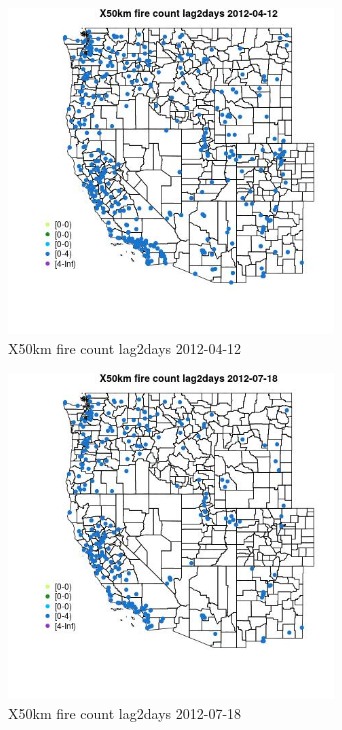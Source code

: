 \begin{figure} 
\centering  
\includegraphics[width=0.77\textwidth]{Code_Outputs/Report_ML_input_PM25_Step4_part_e_de_duplicated_aves_compiled_2019-05-14wNAs_MapObsX50km_fire_count_lag2days2012-04-12.jpg} 
\caption{\label{fig:Report_ML_input_PM25_Step4_part_e_de_duplicated_aves_compiled_2019-05-14wNAsMapObsX50km_fire_count_lag2days2012-04-12}X50km fire count lag2days 2012-04-12} 
\end{figure} 
 

\begin{figure} 
\centering  
\includegraphics[width=0.77\textwidth]{Code_Outputs/Report_ML_input_PM25_Step4_part_e_de_duplicated_aves_compiled_2019-05-14wNAs_MapObsX50km_fire_count_lag2days2012-07-18.jpg} 
\caption{\label{fig:Report_ML_input_PM25_Step4_part_e_de_duplicated_aves_compiled_2019-05-14wNAsMapObsX50km_fire_count_lag2days2012-07-18}X50km fire count lag2days 2012-07-18} 
\end{figure} 
 

